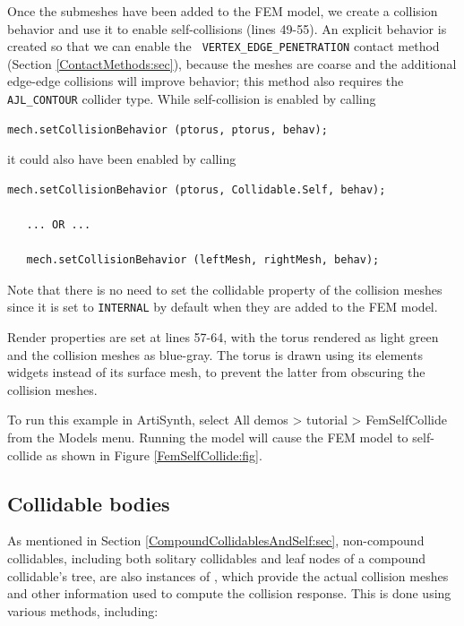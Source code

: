 Once the submeshes have been added to the FEM model, we create a
collision behavior and use it to enable self-collisions (lines
49-55). An explicit behavior is created so that we can enable the {\tt
VERTEX\_EDGE\_PENETRATION} contact method (Section
\ref{ContactMethods:sec}), because the meshes are coarse and the
additional edge-edge collisions will improve behavior; this method also
requires the {\tt AJL\_CONTOUR} collider type. While self-collision is
enabled by calling
%
\begin{lstlisting}[]
   mech.setCollisionBehavior (ptorus, ptorus, behav);
\end{lstlisting}
%
it could also have been enabled by calling
%
\begin{lstlisting}[]
   mech.setCollisionBehavior (ptorus, Collidable.Self, behav);

   ... OR ...

   mech.setCollisionBehavior (leftMesh, rightMesh, behav);
\end{lstlisting}
%
Note that there is no need to set the {\sf collidable} property of the
collision meshes since it is set to {\tt INTERNAL} by default when
they are added to the FEM model.

Render properties are set at lines 57-64, with the torus rendered as
light green and the collision meshes as blue-gray. The torus is drawn
using its elements widgets instead of its surface mesh, to prevent
the latter from obscuring the collision meshes.

To run this example in ArtiSynth, select {\sf All demos > tutorial >
FemSelfCollide} from the {\sf Models} menu. Running the model will
cause the FEM model to self-collide as shown in
Figure \ref{FemSelfCollide:fig}.

\subsection{Collidable bodies}
\label{CollidableBodies:sec}

As mentioned in Section \ref{CompoundCollidablesAndSelf:sec},
non-compound collidables, including both solitary collidables and leaf
nodes of a compound collidable's tree, 
are also instances of 
, which
provide the actual collision meshes and other information used to
compute the collision response. This is done using various
methods, including:

